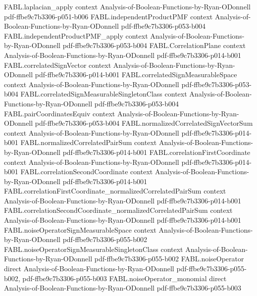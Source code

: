 \begin{theorem}
\proofstep
  {FABL.laplacian_apply}
  {context}
  {Analysis-of-Boolean-Functions-by-Ryan-ODonnell}
  {pdf-ffbe9c7b3306-p051-b006}
\proofstep
  {FABL.independentProductPMF}
  {context}
  {Analysis-of-Boolean-Functions-by-Ryan-ODonnell}
  {pdf-ffbe9c7b3306-p053-b004}
\proofstep
  {FABL.independentProductPMF_apply}
  {context}
  {Analysis-of-Boolean-Functions-by-Ryan-ODonnell}
  {pdf-ffbe9c7b3306-p053-b004}
\proofstep
  {FABL.CorrelationPlane}
  {context}
  {Analysis-of-Boolean-Functions-by-Ryan-ODonnell}
  {pdf-ffbe9c7b3306-p014-b001}
\proofstep
  {FABL.correlatedSignVector}
  {context}
  {Analysis-of-Boolean-Functions-by-Ryan-ODonnell}
  {pdf-ffbe9c7b3306-p014-b001}
\proofstep
  {FABL.correlatedSignMeasurableSpace}
  {context}
  {Analysis-of-Boolean-Functions-by-Ryan-ODonnell}
  {pdf-ffbe9c7b3306-p053-b004}
\proofstep
  {FABL.correlatedSignMeasurableSingletonClass}
  {context}
  {Analysis-of-Boolean-Functions-by-Ryan-ODonnell}
  {pdf-ffbe9c7b3306-p053-b004}
\proofstep
  {FABL.pairCoordinatesEquiv}
  {context}
  {Analysis-of-Boolean-Functions-by-Ryan-ODonnell}
  {pdf-ffbe9c7b3306-p053-b004}
\proofstep
  {FABL.normalizedCorrelatedSignVectorSum}
  {context}
  {Analysis-of-Boolean-Functions-by-Ryan-ODonnell}
  {pdf-ffbe9c7b3306-p014-b001}
\proofstep
  {FABL.normalizedCorrelatedPairSum}
  {context}
  {Analysis-of-Boolean-Functions-by-Ryan-ODonnell}
  {pdf-ffbe9c7b3306-p014-b001}
\proofstep
  {FABL.correlationFirstCoordinate}
  {context}
  {Analysis-of-Boolean-Functions-by-Ryan-ODonnell}
  {pdf-ffbe9c7b3306-p014-b001}
\proofstep
  {FABL.correlationSecondCoordinate}
  {context}
  {Analysis-of-Boolean-Functions-by-Ryan-ODonnell}
  {pdf-ffbe9c7b3306-p014-b001}
\proofstep
  {FABL.correlationFirstCoordinate_normalizedCorrelatedPairSum}
  {context}
  {Analysis-of-Boolean-Functions-by-Ryan-ODonnell}
  {pdf-ffbe9c7b3306-p014-b001}
\proofstep
  {FABL.correlationSecondCoordinate_normalizedCorrelatedPairSum}
  {context}
  {Analysis-of-Boolean-Functions-by-Ryan-ODonnell}
  {pdf-ffbe9c7b3306-p014-b001}
\proofstep
  {FABL.noiseOperatorSignMeasurableSpace}
  {context}
  {Analysis-of-Boolean-Functions-by-Ryan-ODonnell}
  {pdf-ffbe9c7b3306-p055-b002}
\proofstep
  {FABL.noiseOperatorSignMeasurableSingletonClass}
  {context}
  {Analysis-of-Boolean-Functions-by-Ryan-ODonnell}
  {pdf-ffbe9c7b3306-p055-b002}
\proofstep
  {FABL.noiseOperator}
  {direct}
  {Analysis-of-Boolean-Functions-by-Ryan-ODonnell}
  {pdf-ffbe9c7b3306-p055-b002,
    pdf-ffbe9c7b3306-p055-b003}
\proofstep
  {FABL.noiseOperator_monomial}
  {direct}
  {Analysis-of-Boolean-Functions-by-Ryan-ODonnell}
  {pdf-ffbe9c7b3306-p055-b003}

\end{theorem}
